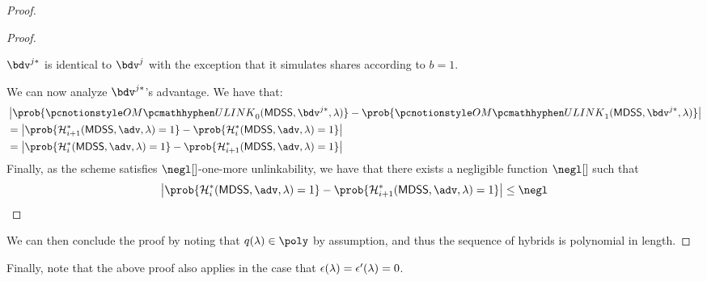 \begin{proof}
\begin{proof}
\begin{pcvstack}[center, space=1em]
		\end{pcvstack}
		$\bdv^{j*}$ is identical to $\bdv^j$ with the exception that it simulates shares according to $b = 1$.

		We can now analyze $\bdv^{j*}$'s advantage.
		We have that:
		\begin{align*}
			 & \left| \prob{\omulink_0(\mdss, \bdv^{j*}, \secpar)} - \prob{\omulink_1(\mdss, \bdv^{j*}, \secpar)} \right|        \\
			 & = \left| \prob{\hyb^*_{i + 1}(\mdss, {\adv}, \secpar) =1} - \prob{\hyb^*_{i}(\mdss, {\adv}, \secpar) = 1} \right| \\
			 & = \left| \prob{\hyb^*_{i}(\mdss, {\adv}, \secpar) =1} - \prob{\hyb^*_{i + 1}(\mdss, {\adv}, \secpar) = 1} \right| \\
		\end{align*}
		Finally, as the scheme satisfies $\negl[]$-one-more unlinkability, we have that there exists a negligible function $\negl[]$ such that
		$$
			\left| \prob{\hyb^*_i(\mdss, {\adv}, \secpar) =1} - \prob{\hyb^*_{i + 1}(\mdss, \adv, \secpar) = 1} \right| \leq \negl
		$$

	\end{proof}

	We can then conclude the proof by noting that $q(\secpar) \in \poly$ by assumption, and thus the sequence of hybrids is polynomial in length.
\end{proof}

Finally, note that the above proof also applies in the case that $\epsilon(\lambda) = \epsilon'(\lambda) = 0$.
